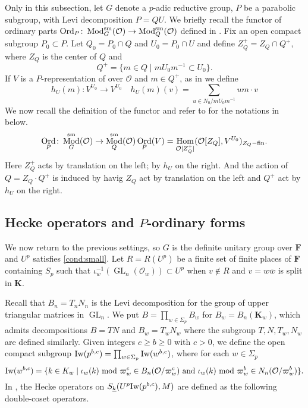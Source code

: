 \documentclass[leqno]{amsart}
\newcommand{\wt}[1]{\underline{ #1 }}
\newcommand{\Iw}{\textnormal{Iw}}
\newcommand{\bw}{\overline{w}}
\DeclareMathOperator{\Mod}{\textnormal{Mod}}
\DeclareMathOperator{\Ord}{Ord}
\newcommand{\sm}{\textnormal{sm}}
\newcommand{\fin}{\textnormal{fin}}
\DeclareMathOperator{\GL}{GL}
\newcommand{\F}{{\mathbf{F}}} %
\newcommand{\K}{{\mathbf{K}}} %
\newcommand{\oo}{\mathcal{O}} %
\DeclareMathOperator{\Hom}{Hom}
\theoremstyle{definition}
\theoremstyle{remark}
\begin{document}
Only in this subsection,
let $G$ denote a  $p$-adic reductive group,
$P$ be a parabolic subgroup,
with Levi decomposition $P=QU$.
We briefly recall the functor
of ordinary parts 
$\Ord_P\colon \Mod_G^{\sm}(\oo)\to \Mod_Q^{\sm}(\oo)$
defined in \cite{emeI}.
Fix an open compact subgroup $P_0\subset P$.
Let  $Q_0=P_0\cap Q$ and $U_0=P_0\cap U$
and define $Z_Q^+=Z_Q\cap Q^+$,
where  $Z_Q$ is the center of $Q$ and
\[
	Q^+=\{m\in Q\mid mU_0m^{-1}\subset U_0\}.
\]
If  $V$ is a $P$-representation of over $\oo$
and  $m\in Q^+$,
as in \cite[Def 3.1.3]{emeI} we define
\begin{equation}\label{def:hUm}
	 h_{U}(m)\colon V^{U_0}\to V^{U_0}\quad
	 h_{U}(m)(v)=\sum_{u\in N_0/m U_0 m^{-1}}um\cdot v
\end{equation}
We now recall the definition of the functor
and refer to \cite[Def 3.1.3]{emeI}
for the notations in below.
\begin{equation}\label{def:OrdP}
	\Ord_P\colon \Mod_G^{\sm}(\oo)\to \Mod_Q^{\sm}(\oo)
	\Ord_P(V)=\Hom_{\oo[Z_Q^+]}(\oo[Z_Q], V^{U_0})_{Z_Q-\fin}.
\end{equation}
Here $Z_Q^+$ acts by translation on the left; 
by $h_U$ on the right.
And the action of $Q=Z_Q\cdot Q^+$ is induced by 
havig $Z_Q$ act by translation on the left and 
$Q^+$ act by $h_U$ on the right.

\subsection{Hecke operators and $P$-ordinary forms}

We now return to the previous settings,
so $G$ is the definite unitary group over $\F$
and  $U^p$ satisfies \eqref{cond:small}.
Let $R=R(U^p)$ be a finite set of
finite places of $\F$ containing $S_p$ such that
$\iota_w^{-1}(\GL_n(\oo_w))\subset U^p$
when  $v\notin R$
and  $v=w\bw$ is split in  $\K$.

Recall that $B_n=T_nN_n$ is the Levi decomposition
for the group of upper triangular matrices in  $\GL_n$.
We put $B=\prod_{w\in \Sigma_p}B_w$
for $B_w=B_n(\K_w)$,
which admits decompositions 
$B=TN$ and  $B_w=T_wN_w$
where the subgroup  $T, N, T_w, N_w$ are defined similarly.
Given integers $c\geq b\geq 0$ with  $c>0$, 
we define 
the open compact subgroup 
$\Iw(p^{b,c})=\prod_{w\in \Sigma_p}\Iw(w^{b,c})$, where 
for each $w\in \Sigma_p$
\begin{equation}\label{def:Iwahori}
	\Iw(w^{b,c})=\{
	k\in K_w\mid 
	\iota_w(k) \text{ mod } \varpi_w^c \in B_n(\oo/\varpi_w^c)
	\text{ and }
	\iota_w(k) \text{ mod } \varpi_w^b \in N_n(\oo/\varpi_w^b)
	\}.
\end{equation}
In \cite{ger},
the Hecke operators on $S_{\wt{k}}(U^p\Iw(p^{b,c}),M)$
are defined as the following double-coset operators.
\end{document}
